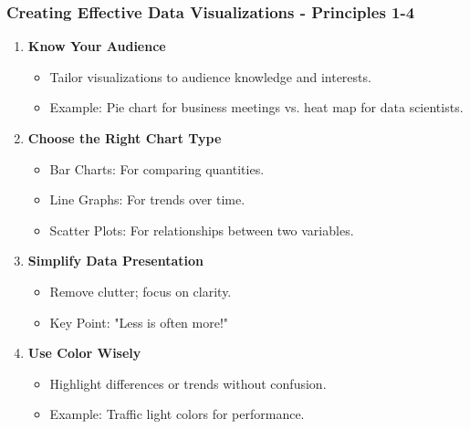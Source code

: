 \documentclass{beamer}
\begin{document}
\begin{frame}[fragile]
    \frametitle{Creating Effective Data Visualizations - Principles 1-4}
    \begin{enumerate}
        \item \textbf{Know Your Audience}
            \begin{itemize}
                \item Tailor visualizations to audience knowledge and interests.
                \item Example: Pie chart for business meetings vs. heat map for data scientists.
            \end{itemize}
        \item \textbf{Choose the Right Chart Type}
            \begin{itemize}
                \item Bar Charts: For comparing quantities.
                \item Line Graphs: For trends over time.
                \item Scatter Plots: For relationships between two variables.
            \end{itemize}
        \item \textbf{Simplify Data Presentation}
            \begin{itemize}
                \item Remove clutter; focus on clarity.
                \item Key Point: "Less is often more!"
            \end{itemize}
        \item \textbf{Use Color Wisely}
            \begin{itemize}
                \item Highlight differences or trends without confusion.
                \item Example: Traffic light colors for performance.
            \end{itemize}
    \end{enumerate}
\end{frame}
\end{document}
